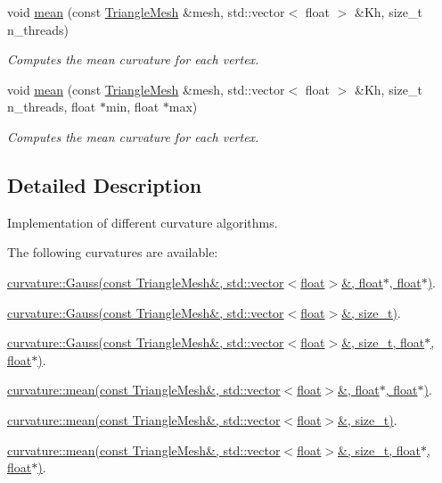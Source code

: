 \begin{DoxyCompactItemize}
void \hyperlink{namespacegeoproc_1_1curvature_a8048e3a6ac3d896f2a795b75996c6997}{mean} (const \hyperlink{classgeoproc_1_1TriangleMesh}{Triangle\+Mesh} \&mesh, std\+::vector$<$ float $>$ \&Kh, size\+\_\+t n\+\_\+threads)
\begin{DoxyCompactList}\small\item\em Computes the mean curvature for each vertex. \end{DoxyCompactList}\item 
void \hyperlink{namespacegeoproc_1_1curvature_abb57cc83faf5e8f776cf3624a0b1b152}{mean} (const \hyperlink{classgeoproc_1_1TriangleMesh}{Triangle\+Mesh} \&mesh, std\+::vector$<$ float $>$ \&Kh, size\+\_\+t n\+\_\+threads, float $\ast$min, float $\ast$max)
\begin{DoxyCompactList}\small\item\em Computes the mean curvature for each vertex. \end{DoxyCompactList}\end{DoxyCompactItemize}


\subsection{Detailed Description}
Implementation of different curvature algorithms. 

The following curvatures are available\+:
\begin{DoxyItemize}
\item \hyperlink{namespacegeoproc_1_1curvature_a1d38de2a33224952f31f3447aafb9484}{curvature\+::\+Gauss(const Triangle\+Mesh\&, std\+::vector$<$float$>$\&, float$\ast$, float$\ast$)}.
\item \hyperlink{namespacegeoproc_1_1curvature_a2b648a2fed90b2541e2c4c48b0bdc514}{curvature\+::\+Gauss(const Triangle\+Mesh\&, std\+::vector$<$float$>$\&, size\+\_\+t)}.
\item \hyperlink{namespacegeoproc_1_1curvature_a8a166392e1df0d1f24f98a214e85aea4}{curvature\+::\+Gauss(const Triangle\+Mesh\&, std\+::vector$<$float$>$\&, size\+\_\+t, float$\ast$, float$\ast$)}.
\item \hyperlink{namespacegeoproc_1_1curvature_ac095baa6ee2f7db33430b8545eae8207}{curvature\+::mean(const Triangle\+Mesh\&, std\+::vector$<$float$>$\&, float$\ast$, float$\ast$)}.
\item \hyperlink{namespacegeoproc_1_1curvature_a8048e3a6ac3d896f2a795b75996c6997}{curvature\+::mean(const Triangle\+Mesh\&, std\+::vector$<$float$>$\&, size\+\_\+t)}.
\item \hyperlink{namespacegeoproc_1_1curvature_abb57cc83faf5e8f776cf3624a0b1b152}{curvature\+::mean(const Triangle\+Mesh\&, std\+::vector$<$float$>$\&, size\+\_\+t, float$\ast$, float$\ast$)}. 
\end{DoxyItemize}

